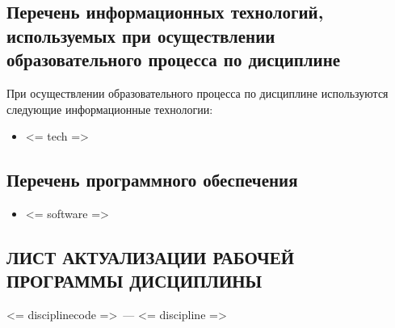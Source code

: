 \documentclass[a4paper,12pt]{article}
\begin{document}
\subsection{Перечень информационных технологий, используемых при осуществлении образовательного процесса по дисциплине}
При осуществлении образовательного процесса по дисциплине используются следующие информационные технологии:
\begin{itemize}[nolistsep]
\item <= tech =>
\end{itemize}

\subsection{Перечень программного обеспечения}
\begin{itemize}[nolistsep]
\item <= software =>
\end{itemize}



\newpage
\begin{center}
\section*{ЛИСТ АКТУАЛИЗАЦИИ РАБОЧЕЙ ПРОГРАММЫ ДИСЦИПЛИНЫ}
<= disciplinecode =>\ --- <= discipline => 
\end{center}
\end{document}
